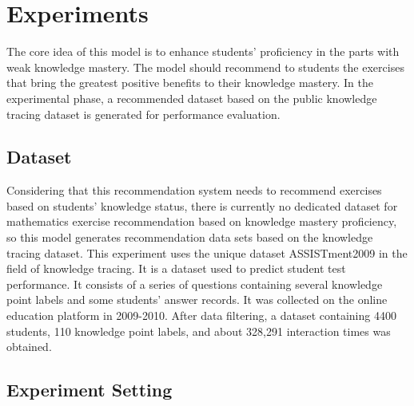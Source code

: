 \section{Experiments}

The core idea of this model is to enhance students' proficiency in the parts with weak knowledge mastery. The model should recommend to students the exercises that bring the greatest positive benefits to their knowledge mastery. In the experimental phase, a recommended dataset based on the public knowledge tracing dataset is generated for performance evaluation.
\subsection{Dataset}

Considering that this recommendation system needs to recommend exercises based on students' knowledge status, there is currently no dedicated dataset for mathematics exercise recommendation based on knowledge mastery proficiency, so this model generates recommendation data sets based on the knowledge tracing dataset. This experiment uses the unique dataset ASSISTment2009 in the field of knowledge tracing. It is a dataset used to predict student test performance. It consists of a series of questions containing several knowledge point labels and some students' answer records. It was collected on the online education platform in 2009-2010. After data filtering, a dataset containing 4400 students, 110 knowledge point labels, and about 328,291 interaction times was obtained.

\subsection{Experiment Setting}


